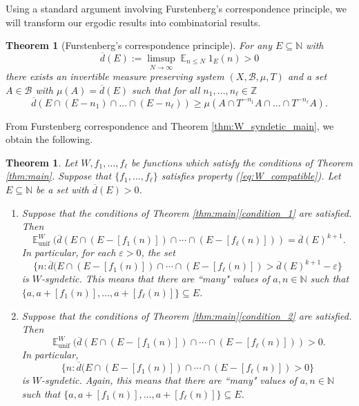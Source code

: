 \documentclass[12pt]{article}
\theoremstyle{plain} %
\newtheorem{theorem}{Theorem}[section]
\theoremstyle{definition} %
\theoremstyle{plain}
\newcounter{MainTheoremCounter}
\newtheorem{maintheorem}[MainTheoremCounter]{Theorem}
\theoremstyle{plain}
\numberwithin{equation}{section}
\newcommand{\N}{\mathbb{N}}
\newcommand{\Z}{\mathbb{Z}}
\renewcommand{\epsilon}{\varepsilon}
\renewcommand{\leq}{\leqslant}
\renewcommand{\geq}{\geqslant}
\renewcommand{\subset}{\subseteq}
\newcommand{\1}{\mathbbm{1}}
\newcommand{\E}{\operatorname{\mathbb{E}}}
\newcommand{\oo}{\infty}
\newcommand{\round}[1]{[ #1 ]}
\begin{document}
Using a standard argument involving Furstenberg's correspondence principle, we will transform our ergodic results into combinatorial results.
\begin{theorem}[Furstenberg’s correspondence principle]\label{thm:Furstenberg_correspondence}
    For any $E\subset \N$ with 
    $$
    \overline{d}(E):=\limsup_{N\to\oo}\E_{n\leq N}1_E(n) > 0
    $$
    there exists an invertible measure preserving system $(X,\mathscr{B},\mu,T)$ and a set $A \in\mathscr{B}$ with $\mu(A) = \overline{d}(E)$ such that for all $n_1,\dots,n_{\ell}\in \Z$
    \[
    \overline{d}(E\cap(E-n_1)\cap\dots \cap (E-n_{\ell})) \geq \mu(A\cap T^{-n_1}A\cap \dots \cap T^{-n_{\ell}}A).
    \]
\end{theorem}
From Furstenberg correspondence and Theorem \ref{thm:W_syndetic_main}, we obtain the following.
\begin{maintheorem}
  Let $W,f_1,\dots, f_{\ell}$ be functions which satisfy the conditions of Theorem \ref{thm:main}. Suppose that $\{f_1,\dots, f_{\ell}\}$ satisfies property (\ref{eq:W_compatible}). Let $E\subset \N$ be a set with $\overline{d}(E)>0$.
     \begin{enumerate}[label = (\roman*)]
        \item Suppose that the conditions of Theorem \ref{thm:main}\ref{condition_1} are satisfied. Then 
        \begin{equation}
            \E_{\text{unif}}^W(\overline{d}(E\cap (E-\round{f_1(n)})\cap \cdots \cap (E-\round{f_{\ell}(n)})) = \overline{d}(E)^{k+1}.
        \end{equation}
        In particular, for each $\epsilon>0$, the set 
        \begin{equation}
            \{n:\overline{d}(E\cap (E-\round{f_1(n)})\cap \cdots \cap (E-\round{f_{\ell}(n)})>\overline{d}(E)^{k+1}-\epsilon\}
        \end{equation}
        is $W$-syndetic. This means that there are ``many" values of $a,n\in \N$ such that $\{a, a+\round{f_1(n)},\dots,a+\round{f_{\ell}(n)}\}\subset E$.
         \item Suppose that the conditions of Theorem \ref{thm:main}\ref{condition_2} are satisfied. Then 
        \begin{equation}
            \E_{\text{unif}}^W(\overline{d}(E\cap (E-\round{f_1(n)})\cap \cdots \cap (E-\round{f_{\ell}(n)})) >0.
        \end{equation}
        In particular,
        \begin{equation}
            \{n:\overline{d}(E\cap (E-\round{f_1(n)})\cap \cdots \cap (E-\round{f_{\ell}(n)})>0\}
        \end{equation}
        is $W$-syndetic. Again, this means that there are ``many" values of $a,n\in \N$ such that $\{a, a+\round{f_1(n)},\dots,a+\round{f_{\ell}(n)}\}\subset E$. 
     \end{enumerate}
\end{maintheorem}
\end{document}
